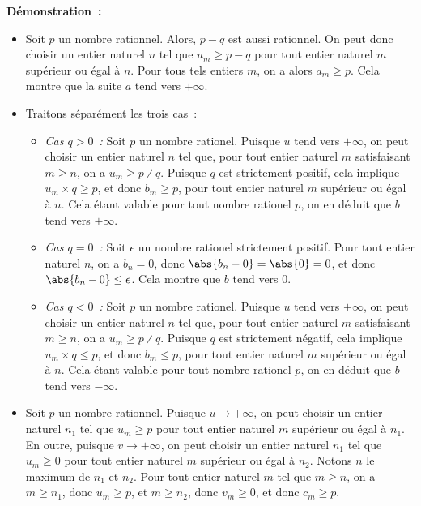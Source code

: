 \noindent\textbf{Démonstration :} 
\begin{itemize}[nosep]
    \item Soit $p$ un nombre rationnel.
        Alors, $p - q$ est aussi rationnel.
        On peut donc choisir un entier naturel $n$ tel que $u_m \geq p - q$ pour tout entier naturel $m$ supérieur ou égal à $n$. 
        Pour tous tels entiers $m$, on a alors $a_m \geq p$.
        Cela montre que la suite $a$ tend vers $+\infty$.
    \item Traitons séparément les trois cas : 
        \begin{itemize}[nosep]
            \item \emph{Cas $q > 0$ :} Soit $p$ un nombre rationel.
                Puisque $u$ tend vers $+\infty$, on peut choisir un entier naturel $n$ tel que, pour tout entier naturel $m$ satisfaisant $m \geq n$, on a $u_m \geq p \divslash q$.
                Puisque $q$ est strictement positif, cela implique $u_m \times q \geq p$, et donc $b_m \geq p$, pour tout entier naturel $m$ supérieur ou égal à $n$.
                Cela étant valable pour tout nombre rationel $p$, on en déduit que $b$ tend vers $+\infty$.
            \item \emph{Cas $q = 0$ :} Soit $\epsilon$ un nombre rationel strictement positif. Pour tout entier naturel $n$, on a $b_n = 0$, donc $\abs{b_n - 0} = \abs{0} = 0$, et donc $\abs{b_n - 0} \leq \epsilon$.
                Cela montre que $b$ tend vers $0$.
            \item \emph{Cas $q < 0$ :} Soit $p$ un nombre rationel.
                Puisque $u$ tend vers $+\infty$, on peut choisir un entier naturel $n$ tel que, pour tout entier naturel $m$ satisfaisant $m \geq n$, on a $u_m \geq p \divslash q$.
                Puisque $q$ est strictement négatif, cela implique $u_m \times q \leq p$, et donc $b_m \leq p$, pour tout entier naturel $m$ supérieur ou égal à $n$.
                Cela étant valable pour tout nombre rationel $p$, on en déduit que $b$ tend vers $-\infty$.
        \end{itemize}
    \item Soit $p$ un nombre rationnel.
        Puisque $u \rightarrow +\infty$, on peut choisir un entier naturel $n_1$ tel que $u_m \geq p$ pour tout entier naturel $m$ supérieur ou égal à $n_1$.
        En outre, puisque $v \rightarrow +\infty$, on peut choisir un entier naturel $n_1$ tel que $u_m \geq 0$ pour tout entier naturel $m$ supérieur ou égal à $n_2$.
        Notons $n$ le maximum de $n_1$ et $n_2$.
        Pour tout entier naturel $m$ tel que $m \geq n$, on a $m \geq n_1$, donc $u_m \geq p$, et $m \geq n_2$, donc $v_m \geq 0$, et donc $c_m \geq p$.

\end{itemize}
